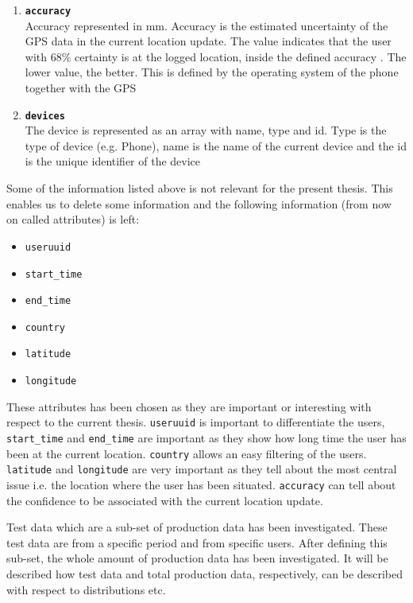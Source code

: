 \begin{enumerate}
\item \texttt{\textbf{accuracy}}\\Accuracy represented in mm. Accuracy is the estimated uncertainty of the GPS data in the current location update. The value indicates that the user with 68\% certainty is at the logged location, inside the defined accuracy \cite{android_accuracy}. The lower value, the better. This is defined by the operating system of the phone together with the GPS 
\item \texttt{\textbf{devices}}\\The device is represented as an array with name, type and id. Type is the type of device (e.g. Phone), name is the name of the current device and the id is the unique identifier of the device 
\end{enumerate}

Some of the information listed above is not relevant for the present thesis. This enables us to delete some information and the following information (from now on called attributes) is left: 

\begin{itemize}
\item \texttt{useruuid}
\item \texttt{start\_time}
\item \texttt{end\_time}
\item \texttt{country}
\item \texttt{latitude}
\item \texttt{longitude}
\end{itemize}

These attributes has been chosen as they are important or interesting with respect to the current thesis. \texttt{useruuid} is important to differentiate the users, \texttt{start\_time} and \texttt{end\_time} are important as they show how long time the user has been at the current location. \texttt{country} allows an easy filtering of the users. \texttt{latitude} and \texttt{longitude} are very important as they tell about the most central issue i.e. the location where the user has been situated. \texttt{accuracy} can tell about the confidence to be associated with the current location update.  

Test data which are a sub-set of production data has been investigated. These test data are from a specific period and from specific users. After defining this sub-set, the whole amount of production data has been investigated.  It will be described how test data and total production data, respectively, can be described with respect to distributions etc.  

